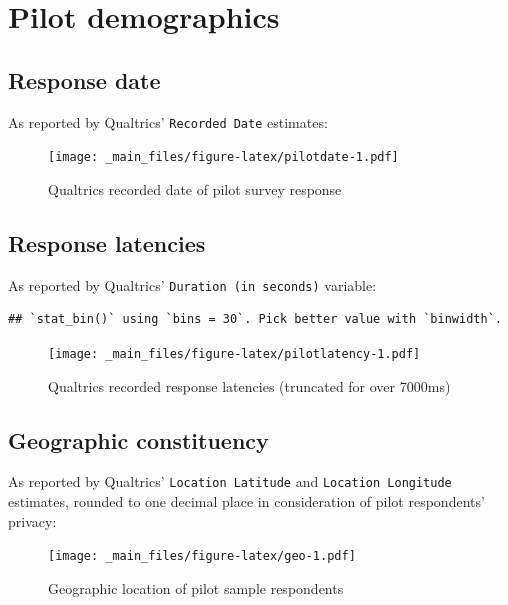 \documentclass[
]{book}
\begin{document}
\hypertarget{pilotdemo}{%
\chapter{Pilot demographics}\label{pilotdemo}}

\hypertarget{responsedate}{%
\section{Response date}\label{responsedate}}

As reported by Qualtrics' \texttt{Recorded\ Date} estimates:

\begin{figure}
\centering
\texttt{[image: \_main\_files/figure-latex/pilotdate-1.pdf]}
\caption{\label{fig:pilotdate}Qualtrics recorded date of pilot survey response}
\end{figure}

\hypertarget{response-latencies}{%
\section{Response latencies}\label{response-latencies}}

As reported by Qualtrics' \texttt{Duration\ (in\ seconds)} variable:

\begin{verbatim}
## `stat_bin()` using `bins = 30`. Pick better value with `binwidth`.
\end{verbatim}

\begin{figure}
\centering
\texttt{[image: \_main\_files/figure-latex/pilotlatency-1.pdf]}
\caption{\label{fig:pilotlatency}Qualtrics recorded response latencies (truncated for over 7000ms)}
\end{figure}

\hypertarget{geo}{%
\section{Geographic constituency}\label{geo}}

As reported by Qualtrics' \texttt{Location\ Latitude} and \texttt{Location\ Longitude} estimates, rounded to one decimal place in consideration of pilot respondents' privacy:

\begin{figure}
\centering
\texttt{[image: \_main\_files/figure-latex/geo-1.pdf]}
\caption{\label{fig:geo}Geographic location of pilot sample respondents}
\end{figure}
\end{document}
